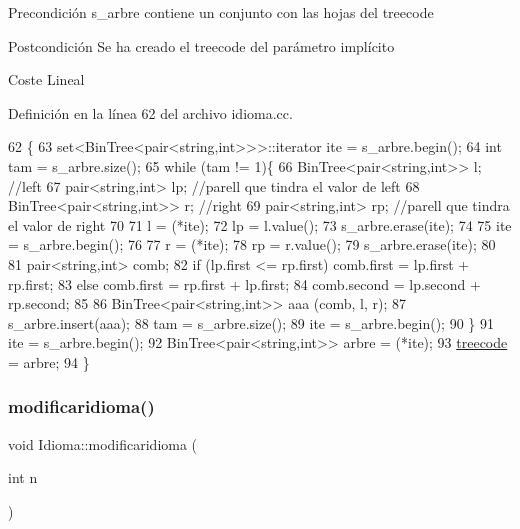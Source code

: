 \begin{DoxyPrecond}{Precondición}
s\+\_\+arbre contiene un conjunto con las hojas del treecode 
\end{DoxyPrecond}
\begin{DoxyPostcond}{Postcondición}
Se ha creado el treecode del parámetro implícito 
\end{DoxyPostcond}
\begin{DoxyParagraph}{Coste}
Lineal 
\end{DoxyParagraph}


Definición en la línea 62 del archivo idioma.\+cc.


\begin{DoxyCode}
62                                                                    \{
63   set<BinTree<pair<string,int>>>::iterator ite = s\_arbre.begin();
64   \textcolor{keywordtype}{int} tam = s\_arbre.size();
65   \textcolor{keywordflow}{while} (tam != 1)\{
66     BinTree<pair<string,int>> l;  \textcolor{comment}{//left}
67     pair<string,int> lp; \textcolor{comment}{//parell que tindra el valor de left}
68     BinTree<pair<string,int>> r;  \textcolor{comment}{//right}
69     pair<string,int> rp; \textcolor{comment}{//parell que tindra el valor de right}
70 
71     l = (*ite);
72     lp = l.value();
73     s\_arbre.erase(ite);
74 
75     ite = s\_arbre.begin();
76 
77     r = (*ite);
78     rp = r.value();
79     s\_arbre.erase(ite);
80 
81     pair<string,int> comb;
82     \textcolor{keywordflow}{if} (lp.first <= rp.first) comb.first = lp.first + rp.first;
83     \textcolor{keywordflow}{else} comb.first = rp.first + lp.first;
84     comb.second = lp.second + rp.second;
85 
86     BinTree<pair<string,int>> aaa (comb, l, r);
87     s\_arbre.insert(aaa);
88     tam = s\_arbre.size();
89     ite = s\_arbre.begin();
90     \}
91   ite = s\_arbre.begin();
92   BinTree<pair<string,int>> arbre = (*ite);
93   \hyperlink{class_idioma_a5eeaf73b2498503c5c686ac259e1f675}{treecode} = arbre;
94 \}
\end{DoxyCode}
\mbox{\label{class_idioma_ad29b4c109c3fd61d7753c3345c438694}} 
\subsubsection{\texorpdfstring{modificaridioma()}{modificaridioma()}}
{\footnotesize\ttfamily void Idioma\+::modificaridioma (\begin{DoxyParamCaption}\item[{int}]{n }\end{DoxyParamCaption})}



